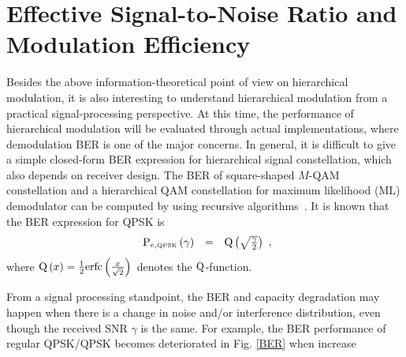 \documentclass[10pt,fleqn, twocolumn]{IEEEtran}
\begin{document}
\section{Effective Signal-to-Noise Ratio and Modulation Efficiency}
Besides the above information-theoretical point of view on
hierarchical modulation, it is also interesting to understand
hierarchical modulation from a practical signal-processing
perspective. At this time, the performance of hierarchical
modulation will be evaluated through actual implementations, where
demodulation BER is one of the major concerns. In general, it is
difficult to give a simple closed-form BER expression for
hierarchical signal constellation, which also depends on receiver
design. The BER of square-shaped $M$-QAM constellation and a
hierarchical QAM constellation for maximum likelihood (ML)
demodulator can be computed by using recursive
algorithms~\cite{Vitt03}. It is known that the BER expression for
QPSK is
\begin{equation}
\begin{array}{rcl}
{\rm P}_{e,\mbox{\tiny QPSK}}\left(\gamma\right)&=&{\rm
Q}\left(\sqrt{\frac{\gamma}{2}}\right)
\end{array},\label{BER_QPSK}
\end{equation}
\noindent where ${\rm Q}\left(x\right)=\frac{1}{2}{\rm
erfc}\left(\frac{x}{\sqrt{2}}\right)$ denotes the $\rm
Q$-function.
\begin{figure} 
\end{figure}
From a signal processing standpoint, the BER and capacity
degradation may happen when there is a change in noise and/or
interference distribution, even though the received SNR $\gamma$
is the same. For example, the BER performance of regular QPSK/QPSK
becomes deteriorated in Fig. \ref{BER} when increase
\end{document}
